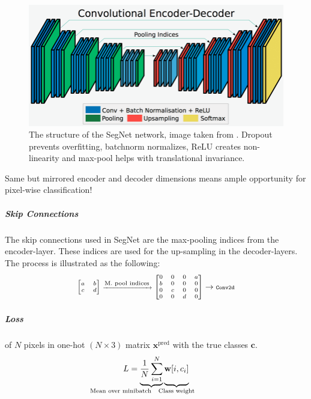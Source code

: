 \documentclass[
    ,title     = {{Image Segmentation for Smart Agriculture}}
    ,subject   = {{This is the subject of my work}}
    ,papersize = {{a1paper}}
    ,nocrop
]{dtuposter}
\begin{document}
\begin{dtupostercontent}
\begin{figure}
	\centering
	\includegraphics[width=0.9\linewidth]{Encoder-Decoder2}
	\caption{The structure of the SegNet network, image taken from \cite{Seg}. Dropout prevents overfitting, batchnorm normalizes, ReLU creates non-linearity and max-pool helps with translational invariance.}
	\label{fig:Structure}
\end{figure}
Same but mirrored encoder and decoder dimensions means ample opportunity for pixel-wise classification! 
\vspace*{-1\baselineskip}
\subparagraph{Skip Connections}
The skip connections used in SegNet are the max-pooling indices from the encoder-layer. These indices are used for the up-sampling in the decoder-layers. The process is illustrated as the following:
\begin{equation*}\label{key}
\scriptsize
\begin{bmatrix}a&b\\c&d\end{bmatrix} \xrightarrow{\text{\scriptsize M. pool indices}}
\begin{bmatrix}0&0&0&a\\b&0&0&0\\0&c&0&0\\0&0&d&0\end{bmatrix} 
\rightarrow 
\texttt{\scriptsize Conv2d}
\end{equation*}
\vspace*{-1\baselineskip}
\subparagraph{Loss} of \(N\) pixels in one-hot \((N \times  3)\) matrix \(\mathbf x^\text{pred}\) with the true classes \(\mathbf c\).
\[
L = \underbrace{
\vphantom{\sum_{i}}
\frac 1 N
\sum_{\mathclap {i=1}}^{N}
}
_{\mathllap{\text{Mean over minibatch}}}
\underbrace{ 
\vphantom{\sum_{i}}
\mathbf{w}[i, c_i]}
_{\mathclap{\text{Class weight}}}  
\]
\end{dtupostercontent}
\end{document}
